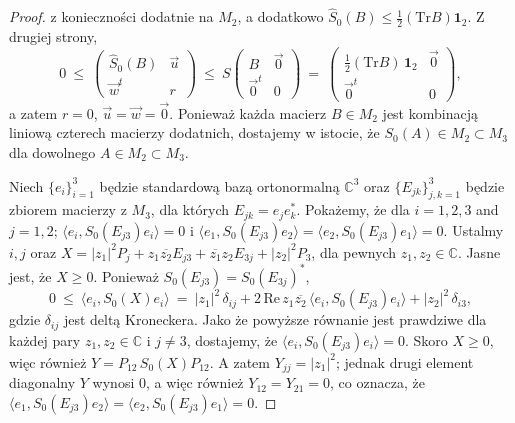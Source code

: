 {\begin{proof}
z konieczności dodatnie na $M_{2}$, a dodatkowo
$\hat{S}_{0}(B) \leq \frac{1}{2} (\text{Tr} B) \mathbf{1}_{2}$.
Z drugiej strony,
\begin{equation}
 0 \: \leq \:
 \begin{pmatrix}
  \hat{S}_{0}(B) & \vec{u} \\ \vec{w}^{t} & r
 \end{pmatrix} \: \leq \:
            S \begin{pmatrix}
               B & \vec{0} \\ \vec{0}^{t} & 0
              \end{pmatrix} \: = \:
 \begin{pmatrix}
  \frac{1}{2} (\text{Tr} B) \, \mathbf{1}_{2} & \vec{0} \\ \vec{0}^{t} & 0
 \end{pmatrix},
\end{equation}
a zatem $r=0$, $\vec{u}=\vec{w}=\vec{0}$.
Ponieważ każda macierz $B \in M_{2}$ jest kombinacją liniową czterech macierzy
dodatnich, dostajemy w istocie, że
$S_{0}(A) \in M_{2} \! \subset \! M_{3}$
dla dowolnego $A \in M_{2} \! \subset \! M_{3}$.

Niech $\{e_{i}\}_{i=1}^{3}$ będzie standardową
bazą ortonormalną $\mathbb{C}^{3}$
oraz $\{ E_{jk} \}_{j,k=1}^{3}$ będzie zbiorem macierzy z $M_{3}$,
dla których $E_{jk} = e_{j} e_{k}^{*}$.
Pokażemy, że dla $i = 1,2,3$ and $j=1,2$;
$\langle e_{i}, S_{0}(E_{j3}) e_{i} \rangle = 0$
i $\langle e_{1}, S_{0}(E_{j3}) e_{2} \rangle =
    \langle e_{2}, S_{0}(E_{j3}) e_{1} \rangle = 0$.
Ustalmy $i,j$ oraz
$X = |z_{1}|^{2} P_{j} + z_{1} \overline{z_{2}} E_{j3} +
\overline{z_{1}} z_{2} E_{3j} + |z_{2}|^{2} P_{3}$,
dla pewnych $z_{1}, z_{2} \in \mathbb{C}$.
Jasne jest, że $X \geq 0$.
Ponieważ $S_{0}(E_{j3}) = S_{0}(E_{3j})^{*}$,
\begin{equation}
0 \: \leq \: \langle e_{i}, S_{0}(X) e_{i} \rangle \: = \:
|z_{1}|^{2} \, \delta_{ij} +
2 \, \text{Re} \, z_{1} \overline{z_{2}} \,
    \langle e_{i}, S_{0}(E_{j3}) e_{i} \rangle +
|z_{2}|^{2} \, \delta_{i3},
\end{equation}
gdzie $\delta_{ij}$ jest deltą Kroneckera.
Jako że powyższe równanie jest prawdziwe dla każdej pary
$z_{1}, z_{2} \in \mathbb{C}$ i $j \neq 3$,
dostajemy, że $\langle e_{i}, S_{0}(E_{j3}) e_{i} \rangle =0$.
Skoro $X \geq 0$, więc również $Y = P_{12} \, S_{0}(X) P_{12}$.
A zatem $Y_{jj} = |z_{1}|^{2}$;
jednak drugi element diagonalny $Y$ wynosi 0, a więc również
$Y_{12} = Y_{21} = 0$,
co oznacza, że
$\langle e_{1}, S_{0}(E_{j3}) e_{2} \rangle
    = \langle e_{2}, S_{0}(E_{j3}) e_{1} \rangle = 0$.


\end{proof}}
